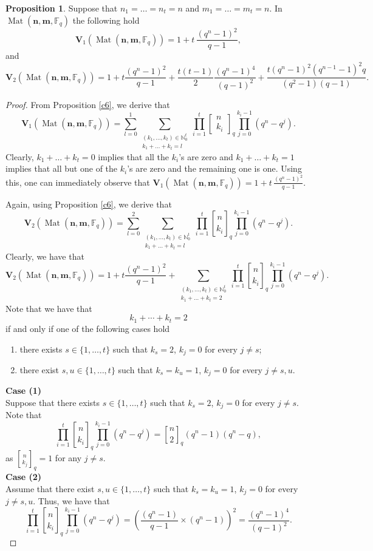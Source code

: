 \documentclass[11pt]{amsart}
\newcommand{\qqbin}[2]{\begin{bmatrix}
		{#1} \\ {#2 }
\end{bmatrix}_q}
\DeclareMathOperator{\Mat}{Mat}
\theoremstyle{definition}
\newtheorem{proposition}[theorem]{Proposition}
\newcommand{\F}{{\mathbb F}}
\newcommand{\bfn}{\mathbf {n}}
\newcommand{\bfm}{\mathbf {m}}
\newcommand{\spacmn}{\Mat(\bfn,\bfm,\F_q)}
\newcommand{\qbinom}[2]{\genfrac{[}{]}{0pt}{}{#1}{#2}_q}
\begin{document}
\begin{proposition}\label{prop:volume1and2}
Suppose that $ n_1 = \ldots = n_t = n $ and $ m_1 = \ldots = m_t = n $. In $\spacmn$ the following hold
\begin{equation}\label{sfera1}
\mathbf{V}_1(\spacmn)=1+ t \, 
	\frac{(q^n-1)^2}{q-1},
\end{equation}
and
\begin{equation}\label{sfera}
\mathbf{V}_2(\spacmn)=1+t\frac{(q^n-1)^2}{q-1}+\frac{t(t-1)}{2}\frac{(q^n-1)^4}{(q-1)^2}+\frac{t(q^n-1)^2(q^{n-1}-1)^2q}{(q^2-1)(q-1)}.
\end{equation}
\end{proposition}
\begin{proof}
From Proposition \ref{c6}, we derive that
$$ \mathbf{V}_1(\spacmn)= \sum_{l=0}^{1} \sum_{\substack{(k_1,\ldots,k_t) \in \mathbb{N}_0^t \\ k_1+\ldots +k_t=l}} \prod_{i=1}^{t} \qqbin{n}{k_i} \prod_{j=0}^{k_i-1} (q^n-q^j). $$
Clearly, $k_1+\ldots +k_t=0$ implies that all the $k_i$'s are zero and $k_1+\ldots +k_t=1$ implies that all but one of the $k_i$'s are zero and the remaining one is one.
Using this, one can immediately observe that $\mathbf{V}_1(\spacmn)=1+ t \, 
	\frac{(q^n-1)^2}{q-1}$.

Again, using Proposition \ref{c6}, we derive that
\[
\mathbf{V}_2(\spacmn)=\sum_{l=0}^{2}\sum_{{\substack{(k_1,\ldots,k_t) \in \mathbb{N}_0^t \\ k_1+\ldots +k_t=l}}}\prod_{i=1}^{t}\qbinom{n}{k_i}\prod_{j=0}^{k_i-1}(q^n-q^j).
\]
Clearly, we have that
\begin{equation}\label{eq:sum3}
\mathbf{V}_2(\spacmn)=1+t\frac{(q^n-1)^2}{q-1}+\sum_{\substack{(k_1,\ldots,k_t) \in \mathbb{N}_0^t \\ k_1+\ldots +k_t=2}}\prod_{i=1}^{t}\qbinom{n}{k_i}\prod_{j=0}^{k_i-1}(q^n-q^j).
\end{equation}
Note that we have that
\[
k_1+\cdots+k_t=2
\]
if and only if one of the following cases hold
\begin{enumerate}
\item[(1)] there exists $s \in \{1,\ldots,t\}$ such that $k_s=2$, $k_j=0$ for every $j\neq s$;
\item[(2)] there exist $s,u \in \{1,\ldots,t\}$ such that $k_s=k_u=1$, $k_j=0$ for every $j\neq s,u$.
\end{enumerate}
\textbf{Case (1)}\\
Suppose that there exists $s \in \{1,\ldots,t\}$ such that $k_s=2$, $k_j=0$ for every $j\neq s$.
Note that 
\[\prod_{i=1}^{t}\qbinom{n}{k_i}\prod_{j=0}^{k_i-1}(q^n-q^j)=\qbinom{n}{2}(q^n-1)(q^n-q),  \]
as $\qbinom{n}{k_j}=1$ for any $j \ne s$.\\
\textbf{Case (2)}\\
Assume that there exist $s,u \in \{1,\ldots,t\}$ such that $k_s=k_u=1$, $k_j=0$ for every $j\neq s,u$.
Thus, we have that
\[
\prod_{i=1}^{t}\qbinom{n}{k_i}\prod_{j=0}^{k_i-1}(q^n-q^j)=\left(\frac{(q^n-1)}{q-1}\times (q^n-1)\right)^2=\frac{(q^n-1)^4}{(q-1)^2}.
\]


\end{proof}
\end{document}
